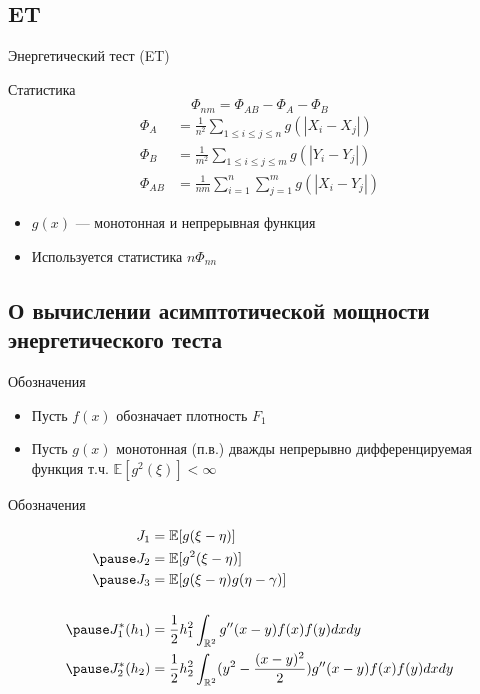 \documentclass[12pt]{beamer}
\begin{document}
\subsection{ET}
\begin{frame}{Энергетический тест (ET)}
    \begin{block}{Статистика}
        \[
        \boxed{\Phi_{nm} = \Phi_{AB} - \Phi_A - \Phi_B}
        \]
        \begin{align*}
        \Phi_A &= \frac{1}{n^2} \sum_{1 \leq i \leq j \leq n} g(|X_i - X_j|) \\
        \Phi_B &= \frac{1}{m^2} \sum_{1 \leq i \leq j \leq m} g(|Y_i - Y_j|) \\
        \Phi_{AB} &= \frac{1}{nm} \sum_{i=1}^n \sum_{j=1}^m g(|X_i - Y_j|)
        \end{align*}
    \end{block}
    
    \begin{itemize}
        \item $g(x)$ --- монотонная и непрерывная функция
        \pause
        \item Используется статистика $n\Phi_{nn}$
    \end{itemize}
\end{frame}

\subsection{О вычислении асимптотической мощности энергетического теста}


\begin{frame}{Обозначения}
	\begin{itemize}
		\item
		Пусть $f(x)$ обозначает плотность $F_1$
		
		\pause
		
		\item 
		Пусть $g(x)$ монотонная (п.в.) дважды непрерывно дифференцируемая функция т.ч. $\mathbb{E}[g^2(\xi)] < \infty$
	\end{itemize}
\end{frame}

\begin{frame}{Обозначения}
	
	\begin{align*}
		J_1 &= \mathbb{E}[g(\xi - \eta)]\\
		\pause
		J_2 &= \mathbb{E}[g^2(\xi - \eta)] \\
		\pause
		J_3 &= \mathbb{E}[g(\xi - \eta)g(\eta - \gamma)] \\[0.2in]
		    \pause
		J^*_1(h_1) &= \frac{1}{2}h^2_1 \int_{\mathbb{R}^2} g''(x-y)f(x)f(y)dxdy \\
		\pause
		J^*_2(h_2) &= \frac{1}{2}h^2_2 \int_{\mathbb{R}^2} (y^2-\frac{(x-y)^2}{2})g''(x-y)f(x)f(y)dxdy \\
	\end{align*}
	
\end{frame}
\end{document}
